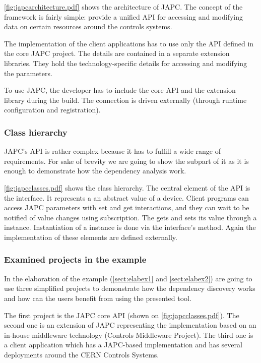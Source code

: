 \autoref{fig:japcarchitecture.pdf} shows the architecture of JAPC. The concept
of the framework is fairly simple: provide a unified API for accessing and
modifying data on certain resources around the controls systems. 

The implementation of the client applications has to use only the API defined
in the core JAPC project. The details are contained in a separate extension
libraries. They hold the  technology-specific details for accessing and
modifying the parameters. 

To use JAPC, the developer has to include the core API and the extension
library during the build. The connection is driven externally (through runtime
configuration and registration).


 \subsubsection{Class hierarchy}
JAPC's API is rather complex because it has to fulfill a wide range of
requirements. For sake of brevity we are going to show the subpart of it
as it is enough to demonstrate how the dependency analysis work.



\autoref{fig:japcclasses.pdf} shows the class hierarchy.
The central element of the API is the  interface.
It  represents a an abstract value of a device.
Client programs can access JAPC parameters with set and get interactions, and
they can wait to be notified of value changes using subscription.
The  gets and sets its value through a  instance.
Instantiation of a  instance is done via the
 interface's  method. Again the
implementation of these elements are defined externally.

\subsubsection{Examined projects in the example}
In the elaboration of the example (\autoref{sect:elabex1} and
\autoref{sect:elabex2}) are going to use three simplified projects to
demonstrate how the dependency discovery works and how can the users benefit
from using the presented tool.

The first project is the JAPC core API (shown on \autoref{fig:japcclasses.pdf}).
The second one is an extension of JAPC representing the implementation based on 
an in-house middleware technology (Controls Middleware Project\cite{Cmw}). The
third one is a client application which has a JAPC-based implementation and has several
deployments around the CERN Controls Systems.


